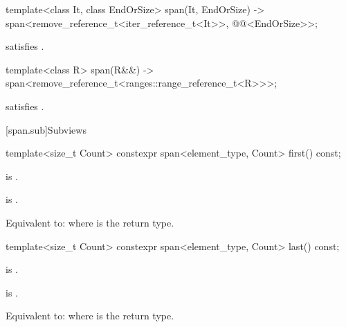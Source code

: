 %
\begin{itemdecl}
template<class It, class EndOrSize>
  span(It, EndOrSize) -> span<remove_reference_t<iter_reference_t<It>>,
                              @@<EndOrSize>>;
\end{itemdecl}

\begin{itemdescr}
\pnum
\constraints
{} satisfies .
\end{itemdescr}

%
\begin{itemdecl}
template<class R>
  span(R&&) -> span<remove_reference_t<ranges::range_reference_t<R>>>;
\end{itemdecl}

\begin{itemdescr}
\pnum
\constraints
{} satisfies .
\end{itemdescr}

[span.sub]{Subviews}

%
\begin{itemdecl}
template<size_t Count> constexpr span<element_type, Count> first() const;
\end{itemdecl}

\begin{itemdescr}
\pnum
\mandates
{} is .

\pnum
\hardexpects
{} is .

\pnum
\effects
Equivalent to: 
where  is the return type.
\end{itemdescr}

%
\begin{itemdecl}
template<size_t Count> constexpr span<element_type, Count> last() const;
\end{itemdecl}

\begin{itemdescr}
\pnum
\mandates
{} is .

\pnum
\hardexpects
{} is .

\pnum
\effects
Equivalent to: 
where  is the return type.
\end{itemdescr}

